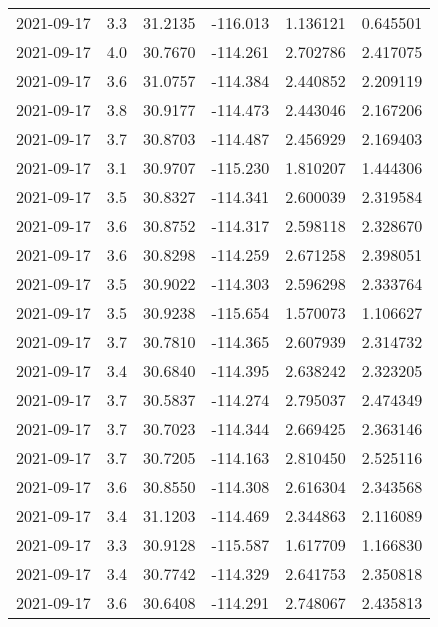 \begin{tabular}{lrrrrr}
2021-09-17 &       3.3 &  31.2135 &  -116.013 &         1.136121 &         0.645501 \\
2021-09-17 &       4.0 &  30.7670 &  -114.261 &         2.702786 &         2.417075 \\
2021-09-17 &       3.6 &  31.0757 &  -114.384 &         2.440852 &         2.209119 \\
2021-09-17 &       3.8 &  30.9177 &  -114.473 &         2.443046 &         2.167206 \\
2021-09-17 &       3.7 &  30.8703 &  -114.487 &         2.456929 &         2.169403 \\
2021-09-17 &       3.1 &  30.9707 &  -115.230 &         1.810207 &         1.444306 \\
2021-09-17 &       3.5 &  30.8327 &  -114.341 &         2.600039 &         2.319584 \\
2021-09-17 &       3.6 &  30.8752 &  -114.317 &         2.598118 &         2.328670 \\
2021-09-17 &       3.6 &  30.8298 &  -114.259 &         2.671258 &         2.398051 \\
2021-09-17 &       3.5 &  30.9022 &  -114.303 &         2.596298 &         2.333764 \\
2021-09-17 &       3.5 &  30.9238 &  -115.654 &         1.570073 &         1.106627 \\
2021-09-17 &       3.7 &  30.7810 &  -114.365 &         2.607939 &         2.314732 \\
2021-09-17 &       3.4 &  30.6840 &  -114.395 &         2.638242 &         2.323205 \\
2021-09-17 &       3.7 &  30.5837 &  -114.274 &         2.795037 &         2.474349 \\
2021-09-17 &       3.7 &  30.7023 &  -114.344 &         2.669425 &         2.363146 \\
2021-09-17 &       3.7 &  30.7205 &  -114.163 &         2.810450 &         2.525116 \\
2021-09-17 &       3.6 &  30.8550 &  -114.308 &         2.616304 &         2.343568 \\
2021-09-17 &       3.4 &  31.1203 &  -114.469 &         2.344863 &         2.116089 \\
2021-09-17 &       3.3 &  30.9128 &  -115.587 &         1.617709 &         1.166830 \\
2021-09-17 &       3.4 &  30.7742 &  -114.329 &         2.641753 &         2.350818 \\
2021-09-17 &       3.6 &  30.6408 &  -114.291 &         2.748067 &         2.435813 \\

\end{tabular}
